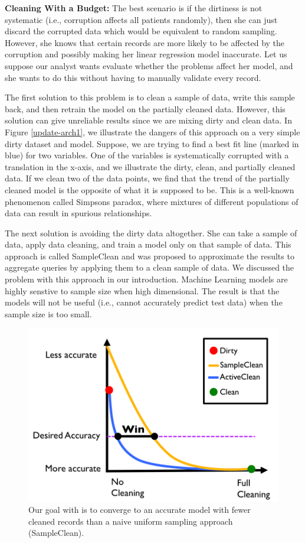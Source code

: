 \noindent\textbf{Cleaning With a Budget: }  The best scenario is if the dirtiness is not systematic (i.e., corruption affects all patients randomly), then she can just discard the corrupted data which would be equivalent to random sampling.
However, she knows that certain records are more likely to be affected by the corruption and possibly making her linear regression model inaccurate. 
Let us suppose our analyst wants evaluate whether the problems affect her model, and she wants to do this without having to manually validate every record.

The first solution to this problem is to clean a sample of data, write this sample back, and then retrain the model on the partially cleaned data.
However, this solution can give unreliable results since we are mixing dirty and clean data.
In Figure \ref{update-arch1}, we illustrate the dangers of this approach on a very simple dirty dataset and model.
Suppose, we are trying to find a best fit line (marked in blue) for two variables. 
One of the variables is systematically corrupted with a translation in the x-axis, and we illustrate the dirty, clean, and partially cleaned data.
If we clean two of the data points, we find that the trend of the partially cleaned model is the opposite of what it is supposed to be.
This is a well-known phenomenon called Simpsons paradox, where mixtures of different populations of data can result in spurious relationships.

The next solution is avoiding the dirty data altogether.
She can take a sample of data, apply data cleaning, and train a model only on that sample of data.
This approach is called SampleClean \cite{wang1999sample} and was proposed to approximate the results to aggregate queries by applying them to a clean sample of data.
We discussed the problem with this approach in our introduction.
Machine Learning models are highly senstive to sample size when high dimensional.
The result is that the models will not be useful (i.e., cannot accurately predict test data) when the sample size is too small.

\vspace{0.5em}

\begin{figure}[t]
\centering
 \includegraphics[width=0.6\columnwidth]{figs/arch2.png}
 \caption{Our goal with \sys is to converge to an accurate model with fewer cleaned records than a naive uniform sampling approach (SampleClean). \label{sys-arch2}}
\end{figure}

